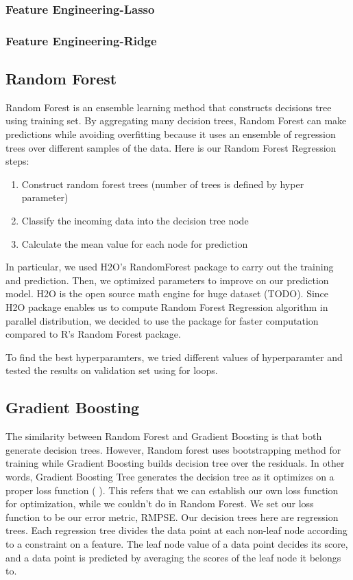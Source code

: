 \documentclass[letterpaper,twocolumn,10pt]{article}
\begin{document}
\subsubsection{Feature Engineering-Lasso}

\subsubsection{Feature Engineering-Ridge}


\subsection{Random Forest}
Random Forest is an ensemble learning method that constructs decisions tree using training set. By aggregating many decision trees, Random Forest can make predictions while avoiding overfitting because it uses an ensemble of regression trees over different samples of the data. Here is our Random Forest Regression steps: \\
\begin{enumerate}
\item Construct random forest trees (number of trees is defined by hyper parameter)
\item Classify the incoming data into the decision tree node
\item Calculate the mean value for each node for prediction
\end{enumerate}

In particular, we used H2O’s RandomForest package to carry out the training and prediction. Then, we optimized parameters to improve on our prediction model. H2O is the open source math engine for huge dataset (TODO). Since H2O package enables us to compute Random Forest Regression algorithm in parallel distribution, we decided to use the package for faster computation compared to R's Random Forest package.

To find the best hyperparamters, we tried different values of hyperparamter and tested the results on validation set using for loops.

\subsection{Gradient Boosting}
The similarity between Random Forest and Gradient Boosting is that both generate decision trees. However, Random forest uses bootstrapping method for training while Gradient Boosting builds decision tree over the residuals. In other words, Gradient Boosting Tree generates the decision tree as it optimizes on a proper loss function (   ). This refers that we can establish our own loss function for optimization, while we couldn't do in Random Forest. We set our loss function to be our error metric, RMPSE. Our decision trees here are regression trees. Each regression tree divides the data point at each non-leaf node according to a constraint on a feature. The leaf node value of a data point decides its score, and a data point is predicted by averaging the scores of the leaf node it belongs to.
\end{document}
